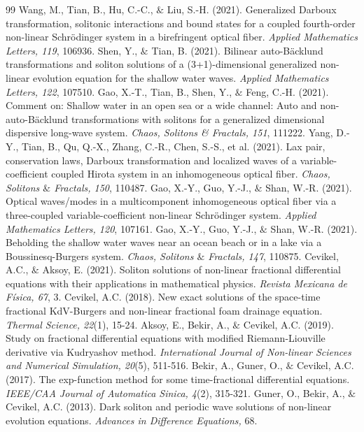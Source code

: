\documentclass{article}
\numberwithin{equation}{section}
\begin{document}
\begin{thebibliography}{99}
 Wang, M., Tian, B., Hu, C.-C., ${\&}$ Liu, S.-H. (2021). Generalized Darboux transformation, solitonic interactions and bound states for a coupled fourth-order non-linear Schr\"{o}dinger system in a birefringent optical fiber. \emph{Applied Mathematics Letters, 119}, 106936.
 Shen, Y., ${\&}$ Tian, B. (2021). Bilinear auto-B\"{a}cklund transformations and soliton solutions of a (3+1)-dimensional generalized non-linear evolution equation for the shallow water waves. \emph{Applied Mathematics Letters, 122}, 107510.
 Gao, X.-T., Tian, B., Shen, Y., ${\&}$ Feng, C.-H. (2021). Comment on: Shallow water in an open sea or a wide channel: Auto and non-auto-B\"{a}cklund transformations with solitons for a generalized dimensional dispersive long-wave system. \emph{Chaos, Solitons {\&} Fractals, 151}, 111222.
 Yang, D.-Y., Tian, B., Qu, Q.-X., Zhang, C.-R., Chen, S.-S., et al. (2021). Lax pair, conservation laws, Darboux transformation and localized waves of a variable-coefficient coupled Hirota system in an inhomogeneous optical fiber. \emph{Chaos, Solitons ${\&}$ Fractals, 150}, 110487.
 Gao, X.-Y., Guo, Y.-J., ${\&}$ Shan, W.-R. (2021). Optical waves/modes in a multicomponent inhomogeneous optical fiber via a three-coupled variable-coefficient non-linear Schr\"{o}dinger system. \emph{Applied Mathematics Letters, 120}, 107161.
Gao, X.-Y., Guo, Y.-J., ${\&}$ Shan, W.-R. (2021). Beholding the shallow water waves near an ocean beach or in a lake via a Boussinesq-Burgers system. \emph{Chaos, Solitons ${\&}$ Fractals, 147}, 110875.
 Cevikel, A.C., ${\&}$ Aksoy, E. (2021). Soliton solutions of non-linear fractional differential equations with their applications in mathematical physics. \emph{Revista Mexicana de Física, 67}, 3.
 Cevikel, A.C. (2018). New exact solutions of the space-time fractional KdV-Burgers and non-linear fractional foam drainage equation. \emph{Thermal Science, 22}(1), 15-24.
 Aksoy, E., Bekir, A., ${\&}$ Cevikel, A.C. (2019). Study on fractional differential equations with modified Riemann-Liouville derivative via Kudryashov method. \emph{International Journal of Non-linear Sciences and Numerical Simulation, 20}(5), 511-516.
 Bekir, A., Guner, O., ${\&}$ Cevikel, A.C. (2017). The exp-function method for some time-fractional differential equations. \emph{IEEE/CAA Journal of Automatica Sinica, 4}(2), 315-321.
 Guner, O., Bekir, A., ${\&}$ Cevikel, A.C. (2013). Dark soliton and periodic wave solutions of non-linear evolution equations. \emph{Advances in Difference Equations,} 68.

\end{thebibliography}
\end{document}
